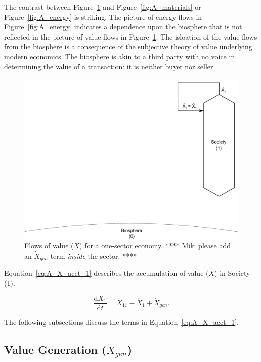 The contrast between Figure~\ref{fig:A_value} and Figure~\ref{fig:A_materials}
or Figure~\ref{fig:A_energy} is striking.  
The picture of energy flows in Figure~\ref{fig:A_energy} indicates a dependence
upon the biosphere that is not reflected in the picture of
value flows in Figure~\ref{fig:A_value}.
The isloation of the value flows from the biosphere is a consequence
of the subjective theory of value 
underlying modern economics.
The biosphere is akin to a third party with no voice 
in determining the value of a transaction:
it is neither buyer nor seller. 

\begin{figure}[h!]
\centering
\includegraphics[width=0.8\linewidth]{Part_3/Chapter_Values/images/1_sector_value.pdf}
\caption{Flows of value ($\dot{X}$) for a one-sector economy. 
**** Mik: please add an $\dot{X}_{gen}$ term \emph{inside} the sector. ****}
\label{fig:A_value} 
\end{figure}

Equation~\ref{eq:A_X_acct_1} describes the accumulation 
of value
($X$) in Society (1).

\begin{equation} \label{eq:A_X_acct_1}
	\frac{\mathrm{d}X_{1}}{\mathrm{d}t} 
	= \dot{X}_{11} 
	- \dot{X}_{1}
	+ \dot{X}_{gen}.
\end{equation}

The following subsections discuss the terms in Equation~\ref{eq:A_X_acct_1}.


\subsection{Value Generation ($\dot{X}_{gen}$)}

